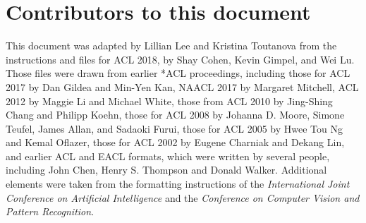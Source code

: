 \documentclass[11pt,a4paper]{article}
\begin{document}
\section{Contributors to this document}
\label{sec:contributors}

This document was adapted by Lillian Lee and Kristina Toutanova
from the instructions and files for ACL 2018, by Shay Cohen, Kevin Gimpel, and
Wei Lu. Those files were drawn from earlier *ACL proceedings, including those
for ACL 2017 by Dan Gildea and Min-Yen Kan, NAACL 2017 by Margaret Mitchell,
ACL 2012 by Maggie Li and Michael White, those from ACL 2010 by Jing-Shing
Chang and Philipp Koehn, those for ACL 2008 by Johanna D. Moore, Simone
Teufel, James Allan, and Sadaoki Furui, those for ACL 2005 by Hwee Tou Ng and
Kemal Oflazer, those for ACL 2002 by Eugene Charniak and Dekang Lin, and
earlier ACL and EACL formats,  which were written by several people,
including John Chen, Henry S. Thompson and Donald Walker. Additional elements
were taken from the formatting instructions of the {\em International Joint
Conference on Artificial   Intelligence} and the \emph{Conference on Computer
Vision and Pattern Recognition}.




\end{document}
